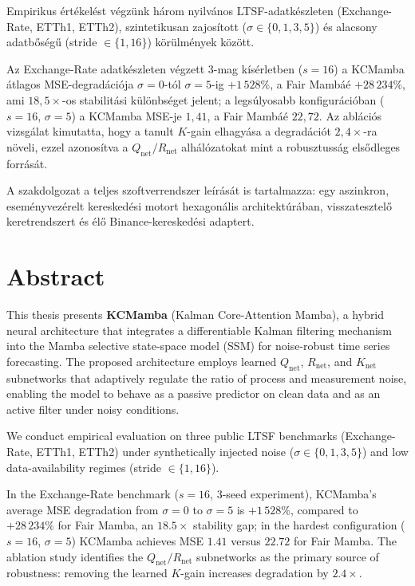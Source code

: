 \documentclass[
]{elteikthesis}[2024/04/26]
\begin{document}
Empirikus értékelést végzünk három nyilvános LTSF-adatkészleten
(Exchange-Rate, ETTh1, ETTh2), szintetikusan zajosított
($\sigma \in \{0, 1, 3, 5\}$) és alacsony adatbőségű (stride $\in \{1, 16\}$)
körülmények között.

Az Exchange-Rate adatkészleten végzett 3-mag kísérletben ($s=16$)
a KCMamba átlagos MSE-degradációja $\sigma{=}0$-tól $\sigma{=}5$-ig
$+1\,528\%$, a Fair Mambáé $+28\,234\%$, ami $18{,}5\times$-os stabilitási
különbséget jelent; a legsúlyosabb konfigurációban ($s{=}16$, $\sigma{=}5$)
a KCMamba MSE-je $1{,}41$, a Fair Mambáé $22{,}72$.
Az ablációs vizsgálat kimutatta, hogy a tanult $K$-gain elhagyása
a degradációt $2{,}4\times$-ra növeli, ezzel azonosítva a
$Q_\text{net}/R_\text{net}$ alhálózatokat mint a robusztusság
elsődleges forrását.

A szakdolgozat a teljes szoftverrendszer leírását is tartalmazza: egy aszinkron,
eseményvezérelt kereskedési motort hexagonális architektúrában, visszatesztelő
keretrendszert és élő Binance-kereskedési adaptert.

\cleardoublepage

\chapter*{Abstract}

This thesis presents \textbf{KCMamba} (Kalman Core-Attention Mamba),
a hybrid neural architecture that integrates a differentiable Kalman filtering
mechanism into the Mamba selective state-space model (SSM) for noise-robust
time series forecasting. The proposed architecture employs learned
$Q_\text{net}$, $R_\text{net}$, and $K_\text{net}$ subnetworks that adaptively
regulate the ratio of process and measurement noise, enabling the model to
behave as a passive predictor on clean data and as an active filter under noisy
conditions.

We conduct empirical evaluation on three public LTSF benchmarks
(Exchange-Rate, ETTh1, ETTh2) under synthetically injected noise
($\sigma \in \{0, 1, 3, 5\}$) and low data-availability regimes
(stride $\in \{1, 16\}$).

In the Exchange-Rate benchmark ($s=16$, 3-seed experiment), KCMamba's average
MSE degradation from $\sigma{=}0$ to $\sigma{=}5$ is $+1\,528\%$, compared
to $+28\,234\%$ for Fair Mamba, an $18.5\times$ stability gap; in the
hardest configuration ($s{=}16$, $\sigma{=}5$) KCMamba achieves MSE $1.41$
versus $22.72$ for Fair Mamba. The ablation study identifies the
$Q_\text{net}/R_\text{net}$ subnetworks as the primary source of robustness:
removing the learned $K$-gain increases degradation by $2.4\times$.
\end{document}
